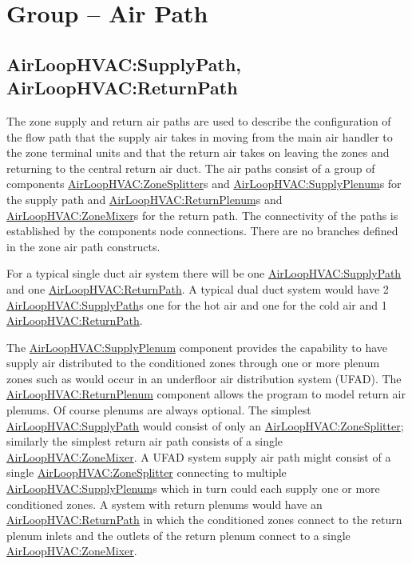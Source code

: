 \section{Group -- Air Path}\label{group-air-path}

\subsection{AirLoopHVAC:SupplyPath, AirLoopHVAC:ReturnPath}\label{airloophvacsupplypath-airloophvacreturnpath}

The zone supply and return air paths are used to describe the configuration of the flow path that the supply air takes in moving from the main air handler to the zone terminal units and that the return air takes on leaving the zones and returning to the central return air duct. The air paths consist of a group of components \hyperref[airloophvaczonesplitter]{AirLoopHVAC:ZoneSplitter}s and \hyperref[airloophvacsupplyplenum]{AirLoopHVAC:SupplyPlenum}s for the supply path and \hyperref[airloophvacreturnplenum]{AirLoopHVAC:ReturnPlenum}s and \hyperref[airloophvaczonemixer]{AirLoopHVAC:ZoneMixer}s for the return path. The connectivity of the paths is established by the components node connections. There are no branches defined in the zone air path constructs.

For a typical single duct air system there will be one \hyperref[airloophvacsupplypath]{AirLoopHVAC:SupplyPath} and one \hyperref[airloophvacreturnpath]{AirLoopHVAC:ReturnPath}. A typical dual duct system would have 2 \hyperref[airloophvacsupplypath]{AirLoopHVAC:SupplyPath}s one for the hot air and one for the cold air and 1 \hyperref[airloophvacreturnpath]{AirLoopHVAC:ReturnPath}.

The \hyperref[airloophvacsupplyplenum]{AirLoopHVAC:SupplyPlenum} component provides the capability to have supply air distributed to the conditioned zones through one or more plenum zones such as would occur in an underfloor air distribution system (UFAD). The \hyperref[airloophvacreturnplenum]{AirLoopHVAC:ReturnPlenum} component allows the program to model return air plenums. Of course plenums are always optional. The simplest \hyperref[airloophvacsupplypath]{AirLoopHVAC:SupplyPath} would consist of only an \hyperref[airloophvaczonesplitter]{AirLoopHVAC:ZoneSplitter}; similarly the simplest return air path consists of a single \hyperref[airloophvaczonemixer]{AirLoopHVAC:ZoneMixer}. A UFAD system supply air path might consist of a single \hyperref[airloophvaczonesplitter]{AirLoopHVAC:ZoneSplitter} connecting to multiple \hyperref[airloophvacsupplyplenum]{AirLoopHVAC:SupplyPlenum}s which in turn could each supply one or more conditioned zones. A system with return plenums would have an \hyperref[airloophvacreturnpath]{AirLoopHVAC:ReturnPath} in which the conditioned zones connect to the return plenum inlets and the outlets of the return plenum connect to a single \hyperref[airloophvaczonemixer]{AirLoopHVAC:ZoneMixer}.

